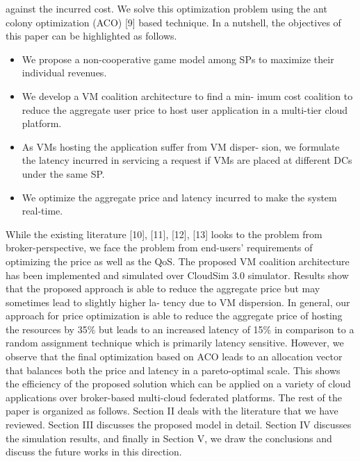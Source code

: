 \documentclass[conference]{IEEEtran}
\newcommand\tab[1][0.8cm]{\hspace*{#1}}
\begin{document}
against the incurred cost. We solve this optimization problem
using the ant colony optimization (ACO) [9] based technique.
In a nutshell, the objectives of this paper can be highlighted
as follows.
\begin{itemize}
	\item We propose a non-cooperative game model among SPs
	to maximize their individual revenues.
	\item We develop a VM coalition architecture to find a min-
	imum cost coalition to reduce the aggregate user price
	to host user application in a multi-tier cloud platform.
	\item As VMs hosting the application suffer from VM disper-
	sion, we formulate the latency incurred in servicing a
	request if VMs are placed at different DCs under the
	same SP.
	\item We optimize the aggregate price and latency incurred to
	make the system real-time.
\end{itemize}
While the existing literature [10], [11], [12], [13] looks to
the problem from broker-perspective, we face the problem
from end-users’ requirements of optimizing the price as well
as the QoS. The proposed VM coalition architecture has
been implemented and simulated over CloudSim 3.0 simulator.
Results show that the proposed approach is able to reduce the
aggregate price but may sometimes lead to slightly higher la-
tency due to VM dispersion. In general, our approach for price
optimization is able to reduce the aggregate price of hosting
the resources by 35\% but leads to an increased latency of 15\%
in comparison to a random assignment technique which is
 primarily latency sensitive. However, we observe that the final
optimization based on ACO leads to an allocation vector that
balances both the price and latency in a pareto-optimal scale.
This shows the efficiency of the proposed solution which can
be applied on a variety of cloud applications over broker-based
multi-cloud federated platforms.
\newline
\tab The rest of the paper is organized as follows. Section II deals with the literature that we have reviewed. Section III
discusses the proposed model in detail. Section IV discusses
the simulation results, and finally in Section V, we draw the
conclusions and discuss the future works in this direction.
\end{document}
